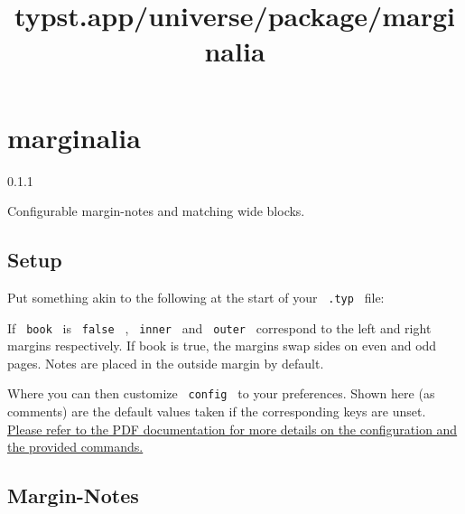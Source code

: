 \title{typst.app/universe/package/marginalia}

\label{banner}
\section{marginalia}\label{marginalia}

{ 0.1.1 }

Configurable margin-notes and matching wide blocks.

\label{readme}
\subsection{Setup}\label{setup}

Put something akin to the following at the start of your
\texttt{\ .typ\ } file:

\begin{Shaded}
\begin{Highlighting}[]
\NormalTok{)}
\NormalTok{)}
\end{Highlighting}
\end{Shaded}

If \texttt{\ book\ } is \texttt{\ false\ } , \texttt{\ inner\ } and
\texttt{\ outer\ } correspond to the left and right margins
respectively. If book is true, the margins swap sides on even and odd
pages. Notes are placed in the outside margin by default.

Where you can then customize \texttt{\ config\ } to your preferences.
Shown here (as comments) are the default values taken if the
corresponding keys are unset.
\href{https://github.com/nleanba/typst-marginalia/blob/v0.1.1/Marginalia.pdf}{Please
refer to the PDF documentation for more details on the configuration and
the provided commands.}

\subsection{Margin-Notes}\label{margin-notes}

